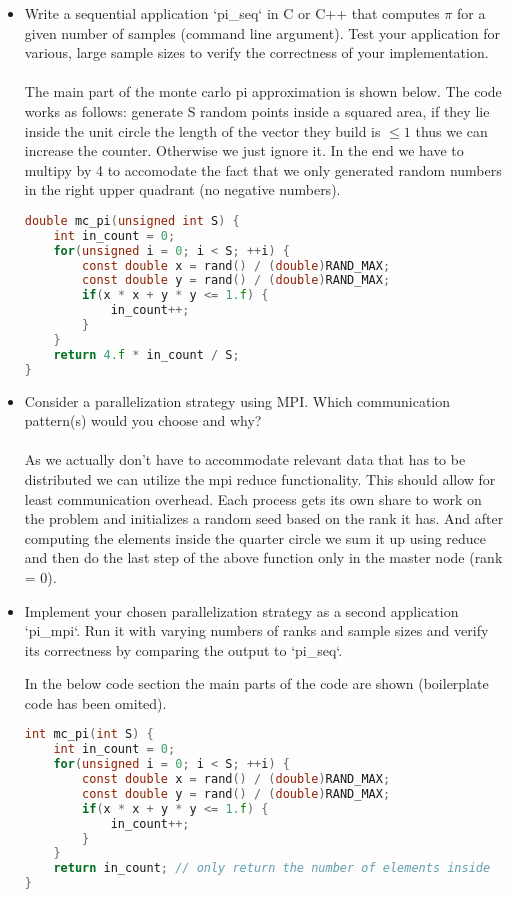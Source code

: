 \documentclass[UTF-8]{article}
\begin{document}
    \begin{itemize}
    	\item Write a sequential application `pi\_seq` in C or C++ that computes $\pi$ for a given number of samples (command line argument). Test your application for various, large sample sizes to verify the correctness of your implementation.
    	\\
     \\
    	The main part of the monte carlo pi approximation is shown below. The code works as follows: generate S random points inside a squared area, if they lie inside the unit circle the length of the vector they build is $\le 1$ thus we can increase the counter. Otherwise we just ignore it. In the end we have to multipy by 4 to accomodate the fact that we only generated random numbers in the right upper quadrant (no negative numbers).
    	\begin{lstlisting}[language=c]
double mc_pi(unsigned int S) {
	int in_count = 0;
	for(unsigned i = 0; i < S; ++i) {
		const double x = rand() / (double)RAND_MAX;
		const double y = rand() / (double)RAND_MAX;
		if(x * x + y * y <= 1.f) {
			in_count++;
		}
	}
	return 4.f * in_count / S;
}\end{lstlisting}
    	
    	
    	\item Consider a parallelization strategy using MPI. Which communication pattern(s) would you choose and why?
    	\\
     \\
    	As we actually don't have to accommodate relevant data that has to be distributed we can utilize the mpi reduce functionality. This should allow for least communication overhead. Each process gets its own share to work on the problem and initializes a random seed based on the rank it has. And after computing the elements inside the quarter circle we sum it up using reduce and then do the last step of the above function only in the master node (rank = 0).
    	
    	\item Implement your chosen parallelization strategy as a second application `pi\_mpi`. Run it with varying numbers of ranks and sample sizes and verify its correctness by comparing the output to `pi\_seq`.

In the below code section the main parts of the code are shown (boilerplate code has been omited).

\begin{lstlisting}[language=c]
int mc_pi(int S) {
    int in_count = 0;
    for(unsigned i = 0; i < S; ++i) {
        const double x = rand() / (double)RAND_MAX;
        const double y = rand() / (double)RAND_MAX;
        if(x * x + y * y <= 1.f) {
            in_count++;
        }
    }
    return in_count; // only return the number of elements inside
}


\end{lstlisting}
\end{itemize}
\end{document}
